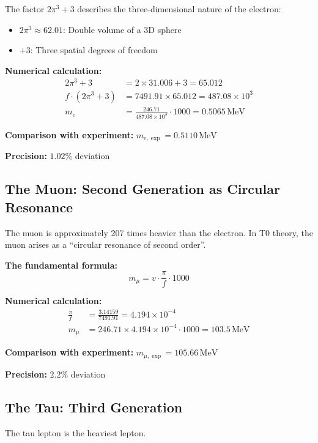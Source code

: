 	The factor \(2\pi^3 + 3\) describes the three-dimensional nature of the electron:
	\begin{itemize}
		\item \(2\pi^3 \approx 62.01\): Double volume of a 3D sphere
		\item \(+3\): Three spatial degrees of freedom
	\end{itemize}
	
	\textbf{Numerical calculation:}
	\begin{align}
		2\pi^3 + 3 &= 2 \times 31.006 + 3 = 65.012 \\
		f \cdot (2\pi^3 + 3) &= 7491.91 \times 65.012 = 487.08 \times 10^{3} \\
		m_e &= \frac{246.71}{487.08 \times 10^{3}} \cdot 1000 = 0.5065\,\text{MeV}
	\end{align}
	
	\textbf{Comparison with experiment:} \(m_{e,\exp} = 0.5110\,\text{MeV}\)
	
	\textbf{Precision:} \(1.02\%\) deviation
	
	\subsection{The Muon: Second Generation as Circular Resonance}
	
	The muon is approximately 207 times heavier than the electron. In T0 theory, the muon arises as a \enquote{circular resonance of second order}.
	
	\textbf{The fundamental formula:}
	\begin{equation}
		\boxed{m_\mu = v \cdot \frac{\pi}{f} \cdot 1000}
	\end{equation}
	
	\textbf{Numerical calculation:}
	\begin{align}
		\frac{\pi}{f} &= \frac{3.14159}{7491.91} = 4.194 \times 10^{-4} \\
		m_\mu &= 246.71 \times 4.194 \times 10^{-4} \cdot 1000 = 103.5\,\text{MeV}
	\end{align}
	
	\textbf{Comparison with experiment:} \(m_{\mu,\exp} = 105.66\,\text{MeV}\)
	
	\textbf{Precision:} \(2.2\%\) deviation
	
	\subsection{The Tau: Third Generation}
	
	The tau lepton is the heaviest lepton.
	
